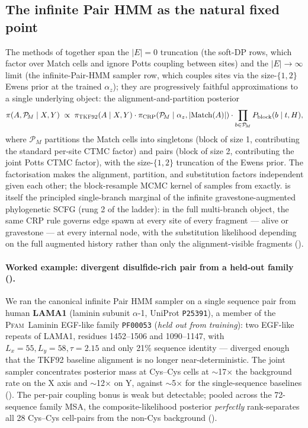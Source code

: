 \documentclass[11pt]{article}
\theoremstyle{definition}
\theoremstyle{remark}
\newcommand{\TKF}{\textsc{TKF}}
\newcommand{\Pfam}{\textsc{Pfam}}
\newcommand{\partition}{\mathcal{P}}
\begin{document}
\subsection{The infinite Pair HMM as the natural fixed point}
\label{sec:results-aln-infinite-phmm}

The methods of  together span the
$|E| = 0$ truncation (the soft-DP rows, which factor over Match
cells and ignore Potts coupling between sites) and the $|E| \to
\infty$ limit (the infinite-Pair-HMM sampler row, which couples
sites via the size-$\{1,2\}$ Ewens prior at the trained
$\alpha_z$); they are progressively faithful approximations
to a single underlying object: the alignment-and-partition posterior
\begin{equation}
\label{eq:infinite-phmm}
\pi(A, \partition_{\!M} \mid X, Y)
  \;\propto\;
  \pi_{\TKF92}(A \mid X, Y) \cdot
  \pi_{\mathrm{CRP}}(\partition_{\!M} \mid \alpha_z, |\mathrm{Match}(A)|) \cdot
  \prod_{b \in \partition_{\!M}} P_{\mathrm{block}}(b \mid t, H),
\end{equation}
where $\partition_{\!M}$ partitions the Match cells into singletons (block
of size 1, contributing the standard per-site CTMC factor) and
pairs (block of size 2, contributing the joint Potts CTMC factor),
with the size-$\{1,2\}$ truncation of the Ewens prior. The
factorisation makes the alignment, partition, and substitution
factors independent given each other; the block-resample MCMC
kernel of  samples from 
exactly.  is itself the principled
single-branch marginal of the infinite gravestone-augmented
phylogenetic SCFG (rung 2 of the ladder): in the full multi-branch
object, the same CRP rule governs edge spawn at every
site of every fragment --- alive or gravestone --- at every
internal node, with the substitution likelihood depending on the
full augmented history rather than only the alignment-visible
fragments ().

\paragraph{Worked example: divergent disulfide-rich pair from a held-out family
().}
We ran the canonical infinite Pair HMM sampler
on a single sequence pair from human \textbf{LAMA1}
(laminin subunit $\alpha$-1, UniProt \texttt{P25391}), a member
of the \Pfam\ Laminin EGF-like family \texttt{PF00053}
(\emph{held out from training}): two EGF-like repeats of LAMA1,
residues 1452--1506 and 1090--1147, with
$L_x{=}55, L_y{=}58, \tau{=}2.15$ and only
21\% sequence identity --- diverged enough that
the TKF92 baseline alignment is no longer near-deterministic.
The joint sampler concentrates posterior mass at Cys--Cys cells at
$\sim$17$\times$ the background rate on the X axis and
$\sim$12$\times$ on Y, against $\sim$5$\times$ for the
single-sequence baselines (). The
per-pair coupling bonus is weak but detectable; pooled across
the 72-sequence family MSA, the composite-likelihood posterior
\emph{perfectly} rank-separates all 28 Cys--Cys cell-pairs from the
non-Cys background ().
\end{document}
